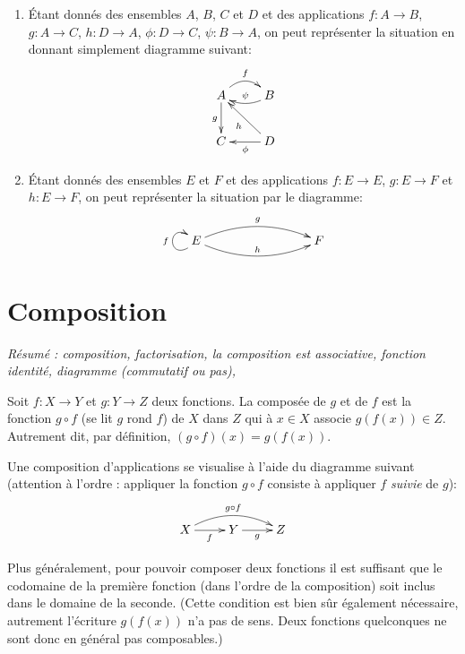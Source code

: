 \begin{exemple}
\begin{enumerate}
\item \'Etant donnés des ensembles $A$, $B$, $C$ et $D$ et des applications $f : A\to B$, $g : A\to C$, $h : D\to A$, $\phi : D\to C$, $\psi : B\to A$, on peut représenter la situation en donnant simplement diagramme suivant:
\[
\xymatrix{
A \ar@/^1pc/[r]^{f} \ar[d]_{g} & B \ar@/^/[l]_{\psi}\\
C & D \ar[ul]^{h} \ar[l]^{\phi}
}
\]
\item \'Etant donnés des ensembles $E$ et $F$ et des applications $f : E\to E$, $g : E\to F$ et $h : E\to F$, on peut représenter la situation par le diagramme:
\[
\xymatrix{
 E \ar@(dl,ul)^{f} \ar@/^1pc/[rrr]^{g} \ar@/_1pc/[rrr]^{h}
& & &  F 
}
\]
\end{enumerate}
\end{exemple}

\section{Composition}

\emph{Résumé : composition, factorisation, la composition est associative, fonction identité, diagramme (commutatif ou pas), }




\begin{definition}[Composition]
Soit $f : X\to Y$ et $g : Y\to Z$ deux fonctions. La composée de $g$ et de $f$ est la fonction $g\circ f$ (se lit \og $g$ rond $f$\fg) de $X$ dans $Z$ qui à $x\in X$ associe $g(f(x)) \in Z$. Autrement dit, par définition, $(g\circ f)(x) = g(f(x))$.

Une composition d'applications se visualise à l'aide du diagramme suivant (attention à l'ordre : appliquer la fonction $g\circ f$ consiste à appliquer $f$ \emph{suivie} de $g$):
\[
\xymatrix{
X \ar[r]_{f} \ar@/^1pc/[rr]^{g\circ f}& Y \ar[r]_{g}& Z
}
\]
\end{definition}

Plus généralement, pour pouvoir composer deux fonctions il est suffisant que le codomaine de la première fonction (dans l'ordre de la composition) soit inclus dans le domaine de la seconde. (Cette condition est bien sûr également nécessaire, autrement l'écriture $g(f(x))$ n'a pas de sens. Deux fonctions quelconques ne sont donc en général pas composables.)

